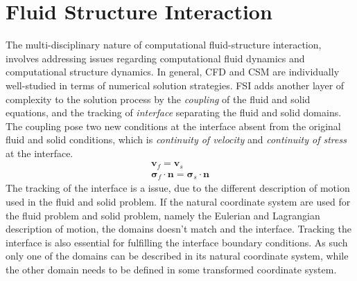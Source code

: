 \chapter{Fluid Structure Interaction}
The multi-disciplinary nature of computational fluid-structure interaction, involves addressing issues regarding computational fluid dynamics and computational structure dynamics. In general, CFD and CSM are individually well-studied in terms of numerical solution strategies. FSI adds another layer of complexity to the solution process by the \textit{coupling} of the fluid and solid equations, and the tracking of \textit{interface} separating the fluid and solid domains. The coupling pose two new conditions at the interface absent from the original fluid and solid conditions, which is \textit{continuity of velocity} and \textit{continuity of stress} at the interface.
\begin{align}
\mathbf{v}_f = \mathbf{v}_s \\
\mathbf{\sigma}_f \cdot \mathbf{n} = \mathbf{\sigma}_s \cdot \mathbf{n}
\label{sec:intcond}
\end{align}
The tracking of the interface is a issue, due to the different description of motion used in the fluid and solid problem. If the natural coordinate system are used for the fluid problem and solid problem, namely the Eulerian and Lagrangian description of motion, the domains doesn't match and the interface. Tracking the interface is also essential for fulfilling the interface boundary conditions. As such only one of the domains can be described in its natural coordinate system, while the other domain needs to be defined in some transformed coordinate system.   
